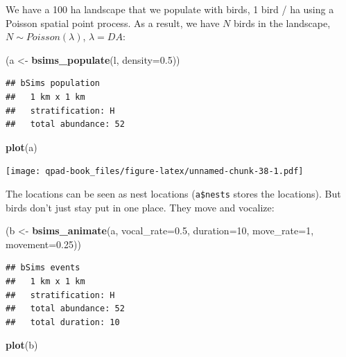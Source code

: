 \documentclass[12pt,]{book}
\newenvironment{Shaded}{\begin{snugshade}}{\end{snugshade}}
\newcommand{\DataTypeTok}[1]{\textcolor[rgb]{0.13,0.29,0.53}{#1}}
\newcommand{\DecValTok}[1]{\textcolor[rgb]{0.00,0.00,0.81}{#1}}
\newcommand{\FloatTok}[1]{\textcolor[rgb]{0.00,0.00,0.81}{#1}}
\newcommand{\KeywordTok}[1]{\textcolor[rgb]{0.13,0.29,0.53}{\textbf{#1}}}
\newcommand{\NormalTok}[1]{#1}
\newcommand{\StringTok}[1]{\textcolor[rgb]{0.31,0.60,0.02}{#1}}
\begin{document}
We have a 100 ha landscape that we populate with birds,
1 bird / ha using a Poisson spatial point process.
As a result, we have \(N\) birds in the landscape,
\(N \sim Poisson(\lambda)\), \(\lambda = DA\):

\begin{Shaded}
\begin{Highlighting}[]
\NormalTok{(a <-}\StringTok{ }\KeywordTok{bsims_populate}\NormalTok{(l, }\DataTypeTok{density=}\FloatTok{0.5}\NormalTok{))}
\end{Highlighting}
\end{Shaded}

\begin{verbatim}
## bSims population
##   1 km x 1 km
##   stratification: H
##   total abundance: 52
\end{verbatim}

\begin{Shaded}
\begin{Highlighting}[]
\KeywordTok{plot}\NormalTok{(a)}
\end{Highlighting}
\end{Shaded}

\texttt{[image: qpad-book\_files/figure-latex/unnamed-chunk-38-1.pdf]}

The locations can be seen as nest locations (\texttt{a\$nests} stores the locations).
But birds don't just stay put in one place. They move and vocalize:

\begin{Shaded}
\begin{Highlighting}[]
\NormalTok{(b <-}\StringTok{ }\KeywordTok{bsims_animate}\NormalTok{(a, }
  \DataTypeTok{vocal_rate=}\FloatTok{0.5}\NormalTok{, }\DataTypeTok{duration=}\DecValTok{10}\NormalTok{,}
  \DataTypeTok{move_rate=}\DecValTok{1}\NormalTok{, }\DataTypeTok{movement=}\FloatTok{0.25}\NormalTok{))}
\end{Highlighting}
\end{Shaded}

\begin{verbatim}
## bSims events
##   1 km x 1 km
##   stratification: H
##   total abundance: 52
##   total duration: 10
\end{verbatim}

\begin{Shaded}
\begin{Highlighting}[]
\KeywordTok{plot}\NormalTok{(b)}
\end{Highlighting}
\end{Shaded}
\end{document}
